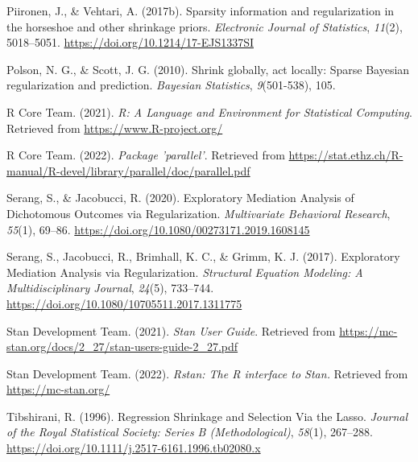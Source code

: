 \documentclass[
  man, donotrepeattitle,floatsintext]{apa6}
\newlength{\cslhangindent}
\newlength{\cslentryspacingunit} %
\newenvironment{CSLReferences}[2] %
 {%
  \setlength{\parindent}{0pt}
  \ifodd #1
  \let\oldpar\par
  \def\par{\hangindent=\cslhangindent\oldpar}
  \fi
  \setlength{\parskip}{#2\cslentryspacingunit}
 }%
 {}
\begin{document}
\begin{CSLReferences}{1}{0}
\leavevmode{}%
Piironen, J., \& Vehtari, A. (2017b). Sparsity information and regularization in the horseshoe and other shrinkage priors. \emph{Electronic Journal of Statistics}, \emph{11}(2), 5018--5051. \url{https://doi.org/10.1214/17-EJS1337SI}

\leavevmode{}%
Polson, N. G., \& Scott, J. G. (2010). Shrink globally, act locally: {Sparse} {Bayesian} regularization and prediction. \emph{Bayesian Statistics}, \emph{9}(501-538), 105.

\leavevmode{}%
R Core Team. (2021). \emph{R: {A} {Language} and {Environment} for {Statistical} {Computing}}. Retrieved from \url{https://www.R-project.org/}

\leavevmode{}%
R Core Team. (2022). \emph{Package 'parallel'}. Retrieved from \url{https://stat.ethz.ch/R-manual/R-devel/library/parallel/doc/parallel.pdf}

\leavevmode{}%
Serang, S., \& Jacobucci, R. (2020). Exploratory {Mediation} {Analysis} of {Dichotomous} {Outcomes} via {Regularization}. \emph{Multivariate Behavioral Research}, \emph{55}(1), 69--86. \url{https://doi.org/10.1080/00273171.2019.1608145}

\leavevmode{}%
Serang, S., Jacobucci, R., Brimhall, K. C., \& Grimm, K. J. (2017). Exploratory {Mediation} {Analysis} via {Regularization}. \emph{Structural Equation Modeling: A Multidisciplinary Journal}, \emph{24}(5), 733--744. \url{https://doi.org/10.1080/10705511.2017.1311775}

\leavevmode{}%
Stan Development Team. (2021). \emph{Stan {User} {Guide}}. Retrieved from \url{https://mc-stan.org/docs/2_27/stan-users-guide-2_27.pdf}

\leavevmode{}%
Stan Development Team. (2022). \emph{Rstan: The {R} interface to {Stan}.} Retrieved from \url{https://mc-stan.org/}

\leavevmode{}%
Tibshirani, R. (1996). Regression {Shrinkage} and {Selection} {Via} the {Lasso}. \emph{Journal of the Royal Statistical Society: Series B (Methodological)}, \emph{58}(1), 267--288. \url{https://doi.org/10.1111/j.2517-6161.1996.tb02080.x}


\end{CSLReferences}
\end{document}
